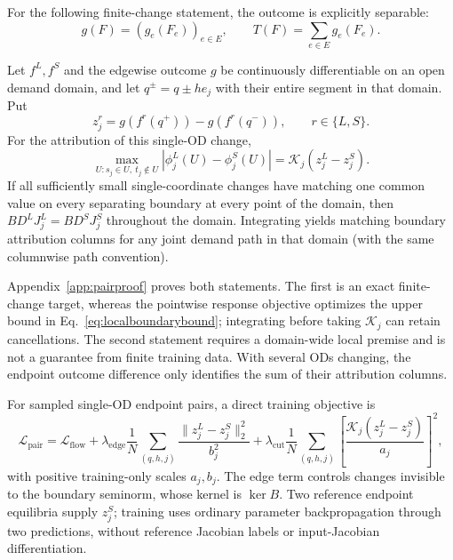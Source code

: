For the following finite-change statement, the outcome is explicitly separable:
\[
g(F)=(g_e(F_e))_{e\in E},\qquad T(F)=\sum_{e\in E}g_e(F_e).
\]
\begin{proposition}\label{prop:pairboundary}
Let $f^L,f^S$ and the edgewise outcome $g$ be continuously differentiable
on an open demand domain, and let $q^\pm=q\pm h e_j$ with their entire
segment in that domain. Put
\[
z_j^r=g(f^r(q^+))-g(f^r(q^-)),\qquad r\in\{L,S\}.
\]
For the attribution of this single-OD change,
\begin{equation}
\max_{U:s_j\in U,\ t_j\notin U}|\phi_j^L(U)-\phi_j^S(U)|
=\mathcal K_j(z_j^L-z_j^S).\label{eq:pairboundaryexact}
\end{equation}
If all sufficiently small single-coordinate changes have matching
one common value on every separating boundary at every point of the domain,
then $BD^LJ_j^L=BD^SJ_j^S$ throughout the domain. Integrating yields
matching boundary attribution columns for any joint demand path in that
domain (with the same columnwise path convention).
\end{proposition}
Appendix~\ref{app:pairproof} proves both statements. The first is an
exact finite-change target, whereas the pointwise response objective
optimizes the upper bound in Eq.~\eqref{eq:localboundarybound}; integrating
before taking $\mathcal K_j$ can retain cancellations. The second statement
requires a domain-wide local premise and is not a guarantee from finite
training data. With several ODs changing, the endpoint outcome difference
only identifies the sum of their attribution columns.

For sampled single-OD endpoint pairs, a direct training objective is
\begin{equation}
\mathcal L_{\mathrm{pair}}=\mathcal L_{\mathrm{flow}}
+\lambda_{\mathrm{edge}}\frac1N\sum_{(q,h,j)}
\frac{\|z_j^L-z_j^S\|_2^2}{b_j^2}
+\lambda_{\mathrm{cut}}\frac1N\sum_{(q,h,j)}
\left[\frac{\mathcal K_j(z_j^L-z_j^S)}{a_j}\right]^2,
\label{eq:pairobjective}
\end{equation}
with positive training-only scales $a_j,b_j$. The edge term controls
changes invisible to the boundary seminorm, whose kernel is $\ker B$.
Two reference endpoint equilibria supply $z_j^S$; training uses ordinary
parameter backpropagation through two predictions, without reference
Jacobian labels or input-Jacobian differentiation.
